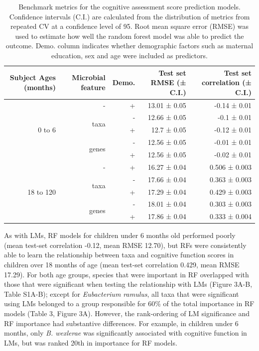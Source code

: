 \documentclass{article}
\begin{document}
\begin{table}[!h]
    \begin{center}
    \begin{tabular}{|r|r|r|r|r|}
      \hline\hline
      \textbf{Subject Ages (months)} & \textbf{Microbial feature} & \textbf{Demo.} & \textbf{Test set RMSE (± C.I.)} & \textbf{Test set correlation (± C.I.)} \\\hline
      \multirow{5}{*}{0 to 6} & - & + & 13.01 ± 0.05 & -0.14 ± 0.01 \\ \cline{2-5}
            & \multirow{2}{*}{taxa} & - & 12.66 ± 0.05 & -0.1 ± 0.01 \\ \cline{3-5}
            &       & + & 12.7 ± 0.05 & -0.12 ± 0.01 \\ \cline{2-5}
            & \multirow{2}{*}{genes} & - & 12.56 ± 0.05 & -0.01 ± 0.01 \\ \cline{3-5}
            &       & + & 12.56 ± 0.05 & -0.02 ± 0.01 \\ \cline{1-5}
      \multirow{5}{*}{18 to 120} & - & + & 16.27 ± 0.04 & 0.506 ± 0.003 \\ \cline{2-5}
            & \multirow{2}{*}{taxa} & - & 17.66 ± 0.04 & 0.363 ± 0.003 \\ \cline{3-5}
            &       & + & 17.29 ± 0.04 & 0.429 ± 0.003 \\ \cline{2-5}
            & \multirow{2}{*}{genes} & - & 18.01 ± 0.04 & 0.303 ± 0.003 \\ \cline{3-5}
            &       & + & 17.86 ± 0.04 & 0.333 ± 0.004 \\\hline\hline
    \end{tabular}
    \caption{\label{tab:rfbench}Benchmark metrics for the cognitive assessment score
    prediction models. Confidence intervals (C.I.) are calculated from the
    distribution of metrics from repeated CV at a confidence level of 95.
    Root mean square error (RMSE) was used to estimate how well the random forest model was able to predict the outcome.
    Demo. column indicates whether demographic factors such as maternal education, sex and age were included as predictors.}
    \end{center}
\end{table}

As with LMs, RF models for children under 6 months old
performed poorly (mean test-set correlation -0.12, mean RMSE 12.70),
but RFs were consistently able to learn the relationship between taxa
and cognitive function scores in children over 18 months of age (mean
test-set correlation 0.429, mean RMSE 17.29). For both age groups,
species that were important in RF overlapped with those that were
significant when testing the relationship with LMs (Figure
3A-B, Table S1A-B); except for \emph{Eubacterium ramulus},
all taxa that were significant using LMs belonged to a group
responsible for 60\% of the total importance in RF models
(Table 3, Figure 3A).
However, the rank-ordering of LM significance and RF importance
had substantive differences. For example, in children under 6 months,
only \emph{B. wexlerae} was significantly associated with cognitive function in LMs, but
was ranked 20th in importance for RF models. 
\end{document}

